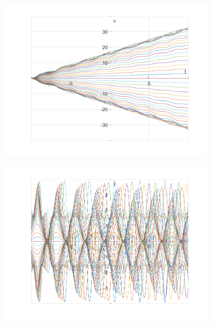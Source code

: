\documentclass{article}
\begin{document}
	\begin{figure}[h!]
		\centering
		\begin{subfigure}[b]{0.48\linewidth}
			\includegraphics[width=\linewidth]{./SmallOscillations/Chaotic/F3.png}
		\end{subfigure}
		\begin{subfigure}[b]{0.48\linewidth}
			\includegraphics[width=\linewidth]{./SmallOscillations/Chaotic/F4.png}
		\end{subfigure}
	\end{figure}
	
\end{document}

